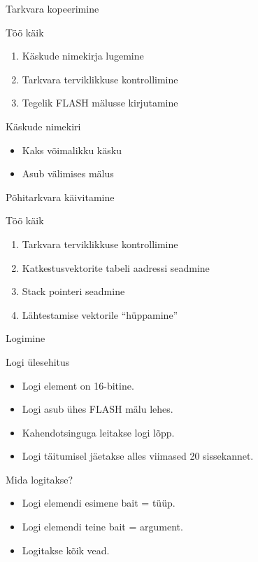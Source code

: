 \documentclass[pdf]{beamer}
\begin{document}
\begin{frame}{Tarkvara kopeerimine}
	\begin{block}{Töö käik}
		\begin{enumerate}
			\item Käskude nimekirja lugemine
			\item Tarkvara terviklikkuse kontrollimine
			\item Tegelik FLASH mälusse kirjutamine
		\end{enumerate}
	\end{block}
	\begin{block}{Käskude nimekiri}
		\begin{itemize}
			\item Kaks võimalikku käsku
			\item Asub välimises mälus
		\end{itemize}
	\end{block}
\end{frame}

\begin{frame}{Põhitarkvara käivitamine}
	\begin{block}{Töö käik}
		\begin{enumerate}
			\item Tarkvara terviklikkuse kontrollimine
			\item Katkestusvektorite tabeli aadressi seadmine
			\item Stack pointeri seadmine
			\item Lähtestamise vektorile ``hüppamine''
		\end{enumerate}
	\end{block}
\end{frame}

\begin{frame}{Logimine}
	\begin{block}{Logi ülesehitus}
		\begin{itemize}
			\item Logi element on 16-bitine.
			\item Logi asub ühes FLASH mälu lehes.
			\item Kahendotsinguga leitakse logi lõpp.
			\item Logi täitumisel jäetakse alles viimased 20 sissekannet.
		\end{itemize}
	\end{block}
	\begin{block}{Mida logitakse?}
		\begin{itemize}
			\item Logi elemendi esimene bait = tüüp.
			\item Logi elemendi teine bait = argument.
			\item Logitakse kõik vead.
		\end{itemize}
	\end{block}
\end{frame}
\end{document}
